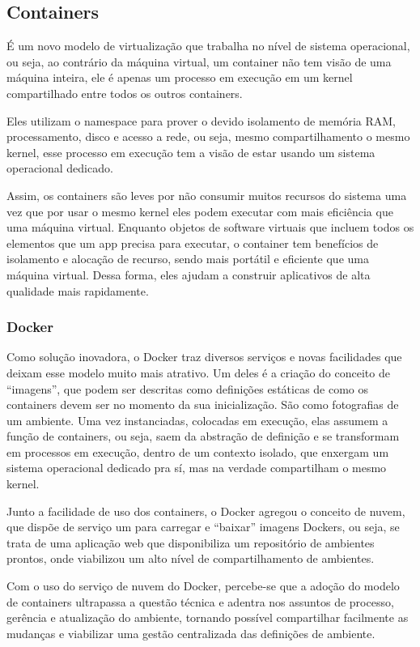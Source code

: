 \subsection{Containers}
É um novo modelo de virtualização que trabalha no nível de sistema operacional,
ou seja, ao contrário da máquina virtual, um container não tem visão de uma
máquina inteira, ele é apenas um processo em execução em um kernel compartilhado
entre todos os outros containers.

Eles utilizam o namespace para prover o devido isolamento de memória RAM,
processamento, disco e acesso a rede, ou seja, mesmo compartilhamento o
mesmo kernel, esse processo em execução tem a visão de estar usando um
sistema operacional dedicado.

Assim, os containers são leves por não consumir muitos recursos do
sistema uma vez que por usar o mesmo kernel eles podem executar com
mais eficiência que uma máquina virtual. Enquanto objetos de software
virtuais que incluem todos os elementos que um app precisa para executar,
o container tem benefícios de isolamento e alocação de recurso, sendo
mais portátil e eficiente que uma máquina virtual. Dessa forma, eles
ajudam a construir aplicativos de alta qualidade mais rapidamente.

\subsubsection{Docker}
Como solução inovadora, o Docker traz diversos serviços e novas
facilidades que deixam esse modelo muito mais atrativo. Um deles
é a criação do conceito de “imagens”, que podem ser descritas como
definições estáticas de como os containers devem ser no momento da
sua inicialização. São como fotografias de um ambiente. Uma vez
instanciadas, colocadas em execução, elas assumem a função de
containers, ou seja, saem da abstração de definição e se transformam
em processos em execução, dentro de um contexto isolado, que
enxergam um sistema operacional dedicado pra sí, mas na verdade
compartilham o mesmo kernel.

Junto a facilidade de uso dos containers, o Docker agregou o
conceito de nuvem, que dispõe de serviço um para carregar e
“baixar” imagens Dockers, ou seja, se trata de uma aplicação
web que disponibiliza um repositório de ambientes prontos,
onde viabilizou um alto nível de compartilhamento de ambientes.

Com o uso do serviço de nuvem do Docker, percebe-se que a
adoção do modelo de containers ultrapassa a questão técnica
e adentra nos assuntos de processo, gerência e atualização
do ambiente, tornando possível compartilhar facilmente as
mudanças e viabilizar uma gestão centralizada das definições
de ambiente.

